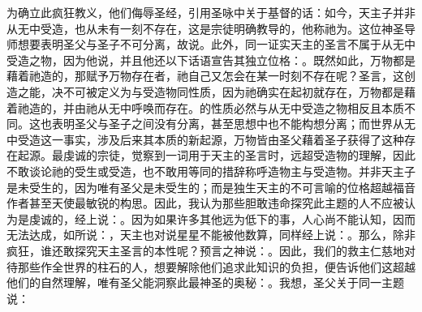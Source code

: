 为确立此疯狂教义，他们侮辱圣经，引用圣咏中关于基督的话：如今，天主子并非从无中受造，也从未有一刻不存在，这是宗徒明确教导的，他称祂为。这位神圣导师想要表明圣父与圣子不可分离，故说。此外，同一证实天主的圣言不属于从无中受造之物，因为他说，并且他还以下话语宣告其独立位格：。既然如此，万物都是藉着祂造的，那赋予万物存在者，祂自己又怎会在某一时刻不存在呢？圣言，这创造之能，决不可被定义为与受造物同性质，因为祂确实在起初就存在，万物都是藉着祂造的，并由祂从无中呼唤而存在。的性质必然与从无中受造之物相反且本质不同。这也表明圣父与圣子之间没有分离，甚至思想中也不能构想分离；而世界从无中受造这一事实，涉及后来其本质的新起源，万物皆由圣父藉着圣子获得了这种存在起源。最虔诚的宗徒，觉察到一词用于天主的圣言时，远超受造物的理解，因此不敢谈论祂的受生或受造，也不敢用等同的措辞称呼造物主与受造物。并非天主子是未受生的，因为唯有圣父是未受生的；而是独生天主的不可言喻的位格超越福音作者甚至天使最敏锐的构思。因此，我认为那些胆敢违命探究此主题的人不应被认为是虔诚的，经上说：。因为如果许多其他远为低下的事，人心尚不能认知，因而无法达成，如所说：，天主也对说星星不能被他数算，同样经上说：。那么，除非疯狂，谁还敢探究天主圣言的本性呢？预言之神说：。因此，我们的救主仁慈地对待那些作全世界的柱石的人，想要解除他们追求此知识的负担，便告诉他们这超越他们的自然理解，唯有圣父能洞察此最神圣的奥秘：。我想，圣父关于同一主题说：\par

